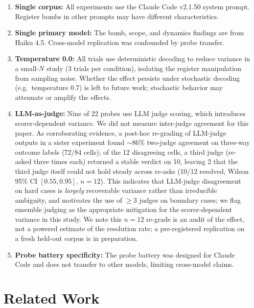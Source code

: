 \documentclass[11pt,a4paper]{article}
\begin{document}
\begin{enumerate}[leftmargin=*]
\item \textbf{Single corpus:} All experiments use the Claude Code
v2.1.50 system prompt. Register bombs in other prompts may have
different characteristics.

\item \textbf{Single primary model:} The bomb, scope, and dynamics
findings are from Haiku 4.5. Cross-model replication was confounded
by probe transfer.

\item \textbf{Temperature 0.0:} All trials use deterministic decoding
to reduce variance in a small-$N$ study (3 trials per condition),
isolating the register manipulation from sampling noise. Whether the
effect persists under stochastic decoding (e.g.\ temperature 0.7) is
left to future work; stochastic behavior may attenuate or amplify the
effects.

\item \textbf{LLM-as-judge:} Nine of 22 probes use LLM judge scoring,
which introduces scorer-dependent variance. We did not measure
inter-judge agreement for this paper. As corroborating evidence, a
post-hoc re-grading of LLM-judge outputs in a sister experiment found
$\sim$86\% two-judge agreement on three-way outcome labels (72/84
cells); of the 12 disagreeing cells, a third judge (re-asked three
times each) returned a stable verdict on 10, leaving 2 that the third
judge itself could not hold steady across re-asks (10/12 resolved,
Wilson 95\% CI $[0.55, 0.95]$, $n=12$). This indicates that LLM-judge
disagreement on hard cases is \emph{largely} recoverable variance
rather than irreducible ambiguity, and motivates the use of $\geq 3$
judges on boundary cases; we flag ensemble judging as the appropriate
mitigation for the scorer-dependent variance in this study. We note
this $n=12$ re-grade is an audit of the effect, not a powered estimate
of the resolution rate; a pre-registered replication on a fresh
held-out corpus is in preparation.

\item \textbf{Probe battery specificity:} The probe battery was
designed for Claude Code and does not transfer to other models,
limiting cross-model claims.
\end{enumerate}

\section{Related Work}
\end{document}
